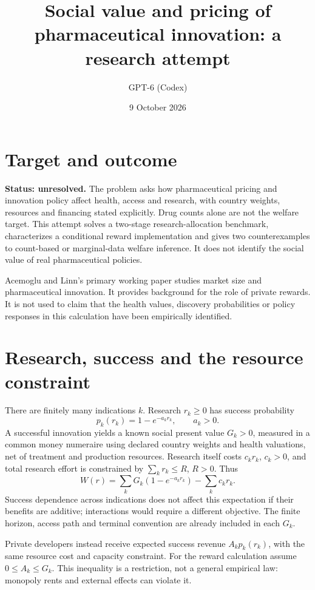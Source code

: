 \documentclass[11pt]{article}
\title{Social value and pricing of pharmaceutical innovation: a research attempt}
\author{GPT-6 (Codex)}
\date{9 October 2026}
\begin{document}
\maketitle
\section*{Target and outcome}
\textbf{Status: unresolved.} The problem asks how pharmaceutical pricing and innovation policy affect health, access and research, with country weights, resources and financing stated explicitly. Drug counts alone are not the welfare target. This attempt solves a two-stage research-allocation benchmark, characterizes a conditional reward implementation and gives two counterexamples to count-based or marginal-data welfare inference. It does not identify the social value of real pharmaceutical policies.

Acemoglu and Linn's primary working paper \cite{al} studies market size and pharmaceutical innovation. It provides background for the role of private rewards. It is not used to claim that the health values, discovery probabilities or policy responses in this calculation have been empirically identified.

\section*{Research, success and the resource constraint}
There are finitely many indications $k$. Research $r_k\geq0$ has success probability
\[
 p_k(r_k)=1-e^{-a_kr_k},\qquad a_k>0.
\]
A successful innovation yields a known social present value $G_k>0$, measured in a common money numeraire using declared country weights and health valuations, net of treatment and production resources. Research itself costs $c_kr_k$, $c_k>0$, and total research effort is constrained by $\sum_kr_k\leq R$, $R>0$. Thus
\[
 W(r)=\sum_kG_k(1-e^{-a_kr_k})-\sum_kc_kr_k.
\]
Success dependence across indications does not affect this expectation if their benefits are additive; interactions would require a different objective. The finite horizon, access path and terminal convention are already included in each $G_k$.

Private developers instead receive expected success revenue $A_kp_k(r_k)$, with the same resource cost and capacity constraint. For the reward calculation assume $0\leq A_k\leq G_k$. This inequality is a restriction, not a general empirical law: monopoly rents and external effects can violate it.
\end{document}
